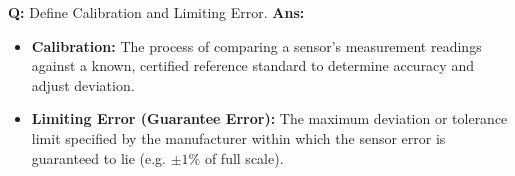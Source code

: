 \documentclass[10pt,a4paper,twocolumn]{article}
\begin{document}
\begin{tcolorbox}[
  colback=white,
  colframe=UnitColorOne,
  colbacktitle=gray!10!white,
  coltitle=black,
  fonttitle=\bfseries\sffamily\small,
  title={Unit I $\bullet$ Card 16: Calibration and Limiting Errors},
  boxrule=1.2pt,
  arc=2mm,
  outer arc=2mm,
  boxsep=1.5mm,
  top=1mm,
  bottom=1mm,
  left=1.5mm,
  right=1.5mm,
  before skip=2.5mm,
  after skip=2.5mm
]
\textbf{Q:} Define Calibration and Limiting Error.
\tcbline
\textbf{Ans:} \begin{itemize}
  \item   \textbf{Calibration:} The process of comparing a sensor's measurement readings against a known, certified reference standard to determine accuracy and adjust deviation.
  \item   \textbf{Limiting Error (Guarantee Error):} The maximum deviation or tolerance limit specified by the manufacturer within which the sensor error is guaranteed to lie (e.g. $\pm 1\%$ of full scale).
\end{itemize}
\end{tcolorbox}
\end{document}
